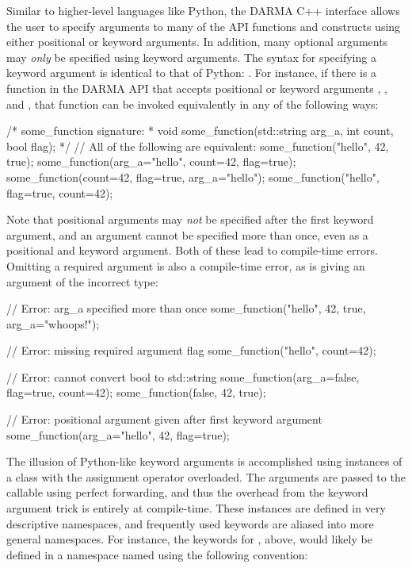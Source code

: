 Similar to higher-level languages like Python, the DARMA C++ interface allows the user
to specify arguments to many of the API functions and constructs using either positional
or keyword arguments.  In addition, many optional arguments may {\em only} be specified using
keyword arguments.  The syntax for specifying a keyword argument is identical to that
of Python: .  For instance, if there is a function  in the
DARMA API that accepts positional or keyword arguments , , and , that 
function can be invoked equivalently in any of the following ways:
\begin{CppCode}
/* some_function signature:
 *  void some_function(std::string arg_a, int count, bool flag);
 */
// All of the following are equivalent:
some_function("hello", 42, true);
some_function(arg_a="hello", count=42, flag=true);
some_function(count=42, flag=true, arg_a="hello");
some_function("hello", flag=true, count=42);
\end{CppCode}
Note that positional arguments may {\em not} be specified after the first keyword argument,
and an argument cannot be specified more than once, even as a positional and keyword
argument.  Both of these lead to compile-time errors. Omitting a required argument is 
also a compile-time error, as is giving an argument of the incorrect type: 
\begin{CppCode}
// Error: arg_a specified more than once
some_function("hello", 42, true, arg_a="whoops!");

// Error: missing required argument flag
some_function("hello", count=42);

// Error: cannot convert bool to std::string
some_function(arg_a=false, flag=true, count=42);
some_function(false, 42, true);

// Error: positional argument given after first keyword argument
some_function(arg_a="hello", 42, flag=true);
\end{CppCode}
The illusion of Python-like keyword arguments is accomplished using  instances
of a class with the assignment operator overloaded.  The arguments are passed to the 
callable using perfect forwarding, and thus the overhead from the keyword argument 
trick is entirely at compile-time.  These instances are defined in very descriptive
namespaces, and frequently used keywords are aliased into more general namespaces.  For
instance, the keywords for , above, would likely be
defined in a namespace named using the following convention:
